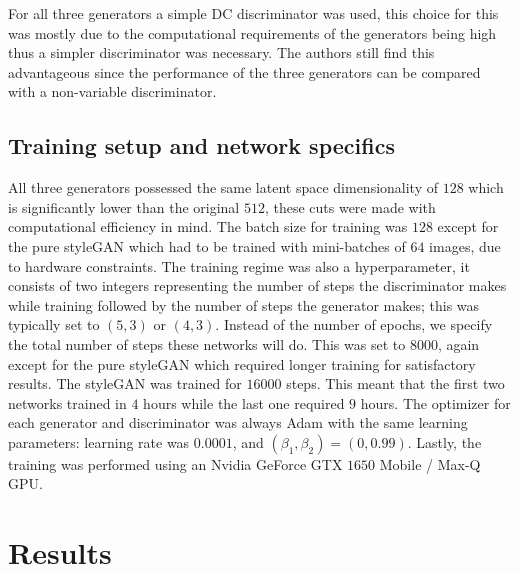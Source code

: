 \documentclass[conference]{IEEEtran}
\begin{document}
For all three generators a simple DC discriminator was used, this choice for this was mostly due to the computational requirements of the generators being high thus a simpler discriminator was necessary. The authors still find this advantageous since the performance of the three generators can be compared with a non-variable discriminator.

\subsection{Training setup and network specifics}
All three generators possessed the same latent space dimensionality of $128$ which is significantly lower than the original $512$, these cuts were made with computational efficiency in mind. The batch size for training was $128$ except for the pure styleGAN which had to be trained with mini-batches of $64$ images, due to hardware constraints. The training regime was also a hyperparameter, it consists of two integers representing the number of steps the discriminator makes while training followed by the number of steps the generator makes; this was typically set to $(5, 3)$ or $(4, 3)$. Instead of the number of epochs, we specify the total number of steps these networks will do. This was set to 8000, again except for the pure styleGAN which required longer training for satisfactory results. The styleGAN was trained for $16000$ steps. This meant that the first two networks trained in $4$ hours while the last one required $9$ hours.
The optimizer for each generator and discriminator was always Adam with the same learning parameters: learning rate was $0.0001$, and $(\beta_1,\beta_2) = (0, 0.99)$. Lastly, the training was performed using an Nvidia GeForce GTX $1650$ Mobile / Max-Q GPU.

\section{Results}
\end{document}

